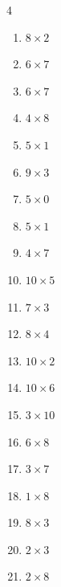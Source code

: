 \begin{multicols}{4}
\begin{enumerate}
  \item $8\times 2$
        \phantom{$=16$}

  \item $6\times 7$
        \phantom{$=42$}

  \item $6\times 7$
        \phantom{$=42$}

  \item $4\times 8$
        \phantom{$=32$}

  \item $5\times 1$
        \phantom{$=5$}

  \item $9\times 3$
        \phantom{$=27$}

  \item $5\times 0$
        \phantom{$=0$}

  \item $5\times 1$
        \phantom{$=5$}

  \item $4\times 7$
        \phantom{$=28$}

  \item $10\times 5$
        \phantom{$=50$}

  \item $7\times 3$
        \phantom{$=21$}

  \item $8\times 4$
        \phantom{$=32$}

  \item $10\times 2$
        \phantom{$=20$}

  \item $10\times 6$
        \phantom{$=60$}

  \item $3\times 10$
        \phantom{$=30$}

  \item $6\times 8$
        \phantom{$=48$}

  \item $3\times 7$
        \phantom{$=21$}

  \item $1\times 8$
        \phantom{$=8$}

  \item $8\times 3$
        \phantom{$=24$}

  \item $2\times 3$
        \phantom{$=6$}

\columnbreak %

  \item $2\times 8$
        \phantom{$=16$}


\end{enumerate}
\end{multicols}
